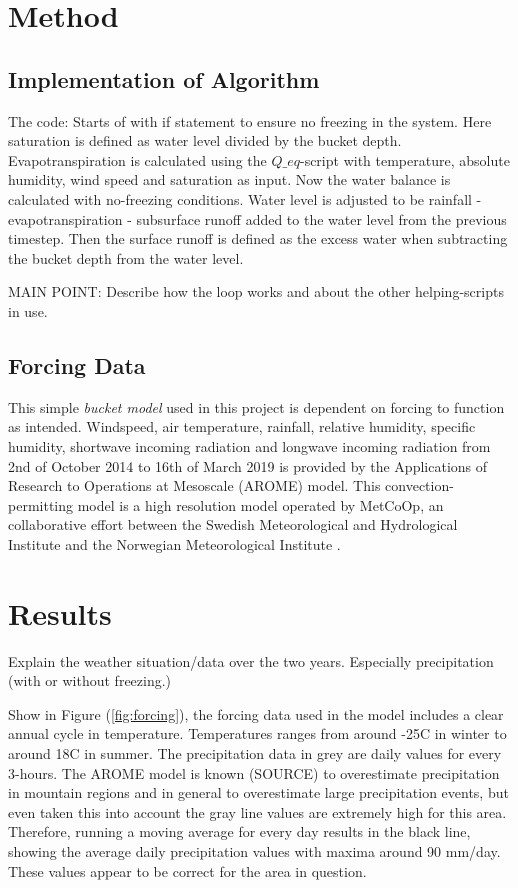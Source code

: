 \documentclass[a4paper,11pt,twocolumn]{article}
\begin{document}
\section{Method}
\subsection{Implementation of Algorithm}
The code: Starts of with if statement to ensure no freezing in the system. Here saturation is defined as water level divided by the bucket depth. Evapotranspiration is calculated using the $Q\_eq$-script with temperature, absolute humidity, wind speed and saturation as input. Now the water balance is calculated with no-freezing conditions. Water level is adjusted to be rainfall - evapotranspiration - subsurface runoff added to the water level from the previous timestep. Then the surface runoff is defined as the excess water when subtracting the bucket depth from the water level. 


MAIN POINT: Describe how the loop works and about the other helping-scripts in use. 

\subsection{Forcing Data}

This simple \textit{bucket model} used in this project is dependent on forcing to function as intended. Windspeed, air temperature, rainfall, relative humidity, specific humidity, shortwave incoming radiation and longwave incoming radiation from 2nd of October 2014 to 16th of March 2019 is provided by the Applications of Research to Operations at Mesoscale (AROME) model. This convection-permitting model is a high resolution model operated by MetCoOp, an collaborative effort between the Swedish Meteorological and Hydrological Institute and the Norwegian Meteorological Institute \cite{muller}. 


\section{Results}
Explain the weather situation/data over the two years. Especially precipitation (with or without freezing.)

Show in Figure (\ref{fig:forcing}), the forcing data used in the model includes a clear annual cycle in temperature. Temperatures ranges from around -25\textdegree C in winter to around 18\textdegree C in summer. The precipitation data in grey are daily values for every 3-hours. The AROME model is known (SOURCE) to overestimate precipitation in mountain regions and in general to overestimate large precipitation events, but even taken this into account the gray line values are extremely high for this area. Therefore, running a moving average for every day results in the black line, showing the average daily precipitation values with maxima around 90 mm/day. These values appear to be correct for the area in question.   
\end{document}
